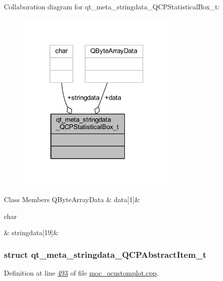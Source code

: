 Collaboration diagram for qt\+\_\+meta\+\_\+stringdata\+\_\+\+Q\+C\+P\+Statistical\+Box\+\_\+t\+:
\nopagebreak
\begin{figure}[H]
\begin{center}
\leavevmode
\includegraphics[width=222pt]{d1/d0d/a00171}
\end{center}
\end{figure}
\begin{DoxyFields}{Class Members}
\hypertarget{a00016_a5e26535af2751ed72a5c0a296eff07f6}{Q\+Byte\+Array\+Data}\label{a00016_a5e26535af2751ed72a5c0a296eff07f6}
&
data\mbox{[}1\mbox{]}&
\\
\hline

\hypertarget{a00016_a69ea5a8754685d08ddf21f3f6478bb52}{char}\label{a00016_a69ea5a8754685d08ddf21f3f6478bb52}
&
stringdata\mbox{[}19\mbox{]}&
\\
\hline

\end{DoxyFields}
\label{d1/d84/a00097}
\hypertarget{a00016_d1/d84/a00097}{}
\subsubsection{struct qt\+\_\+meta\+\_\+stringdata\+\_\+\+Q\+C\+P\+Abstract\+Item\+\_\+t}


Definition at line \hyperlink{a00016_source_l00493}{493} of file \hyperlink{a00016_source}{moc\+\_\+qcustomplot.\+cpp}.



